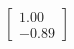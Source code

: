 \documentclass[preview]{standalone}
\begin{document}
\begin{align*}
\begin{bmatrix} 1.00 \\ -0.89 \end{bmatrix}
\end{align*}
\end{document}
